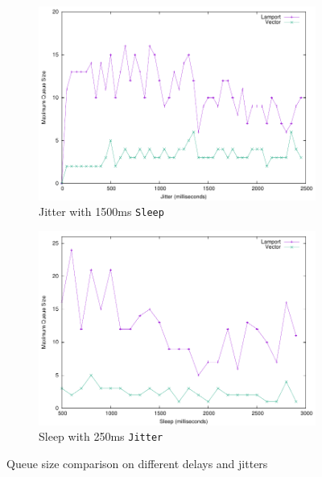 \documentclass[a4paper, 11pt]{article}
\begin{document}
\begin{figure}[H]
  \begin{center}
    \begin{subfigure}[b]{0.494\textwidth}
      \centering
      \includegraphics[width=\textwidth]{test/jitter.pdf}
      \caption{Jitter with 1500ms \texttt{Sleep}}
      \label{fig:results1}
    \end{subfigure}
    \hfill
    \begin{subfigure}[b]{0.494\textwidth}
      \centering
      \includegraphics[width=\textwidth]{test/sleep.pdf}
      \caption{Sleep with 250ms \texttt{Jitter}}
      \label{fig:results2}
    \end{subfigure}
  \end{center}
  \caption{Queue size comparison on different delays and jitters}
  \label{fig:comparison}
\end{figure}
\end{document}
